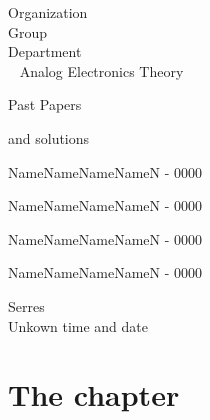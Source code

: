 \documentclass[12pt,a4paper,oneside]{book}
\begin{document}
\begin{titlepage}

\begin{center}
\Large Organization \\
\large Group\\
Department \\

\vspace*{5cm}
\Huge \,\,\, Analog Electronics Theory

\large Past Papers

 and solutions
 \vspace*{4cm}
 
NameNameNameNameN - 0000

NameNameNameNameN - 0000

NameNameNameNameN - 0000

NameNameNameNameN - 0000 

 \vspace*{2.5cm}
 \nopagebreak
Serres\\
Unkown time and date

\end{center}

\end{titlepage}


\chapter*{The chapter}
\end{document}
